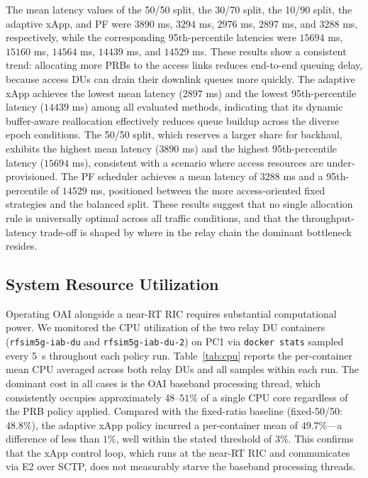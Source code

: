 \documentclass[conference, a4paper]{IEEEtran}
\begin{document}
The mean latency values of the 50/50 split, the 30/70 split, the 10/90 split, the adaptive xApp, and PF were $3890$ ms, $3294$ ms, $2976$ ms, $2897$ ms, and $3288$ ms, respectively, while the corresponding 95th-percentile latencies were $15694$ ms, $15160$ ms, $14564$ ms, $14439$ ms, and $14529$ ms. These results show a consistent trend: allocating more PRBs to the access links reduces end-to-end queuing delay, because access DUs can drain their downlink queues more quickly. The adaptive xApp achieves the lowest mean latency ($2897$ ms) and the lowest 95th-percentile latency ($14439$ ms) among all evaluated methods, indicating that its dynamic buffer-aware reallocation effectively reduces queue buildup across the diverse epoch conditions. The 50/50 split, which reserves a larger share for backhaul, exhibits the highest mean latency ($3890$ ms) and the highest 95th-percentile latency ($15694$ ms), consistent with a scenario where access resources are under-provisioned. The PF scheduler achieves a mean latency of $3288$ ms and a 95th-percentile of $14529$ ms, positioned between the more access-oriented fixed strategies and the balanced split. These results suggest that no single allocation rule is universally optimal across all traffic conditions, and that the throughput-latency trade-off is shaped by where in the relay chain the dominant bottleneck resides.

\subsection{System Resource Utilization}
Operating OAI alongside a near-RT RIC requires substantial computational power. We monitored the CPU utilization of the two relay DU containers (\texttt{rfsim5g-iab-du} and \texttt{rfsim5g-iab-du-2}) on PC1 via \texttt{docker stats} sampled every 5~s throughout each policy run. Table~\ref{tab:cpu} reports the per-container mean CPU averaged across both relay DUs and all samples within each run. The dominant cost in all cases is the OAI baseband processing thread, which consistently occupies approximately $48$--$51$\% of a single CPU core regardless of the PRB policy applied. Compared with the fixed-ratio baseline (fixed-50/50: $48.8$\%), the adaptive xApp policy incurred a per-container mean of $49.7$\%---a difference of less than $1$\%, well within the stated threshold of $3$\%. This confirms that the xApp control loop, which runs at the near-RT RIC and communicates via E2 over SCTP, does not measurably starve the baseband processing threads.
\end{document}
